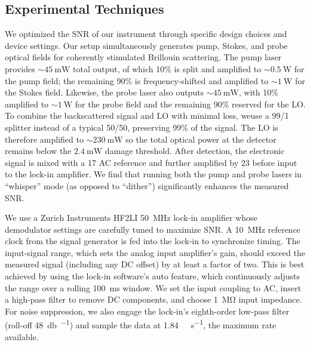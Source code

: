 \subsection{Experimental Techniques}
\label{Methods:Experimental Techniques}
We optimized the \ac{SNR} of our instrument through specific design choices and device settings. Our setup simultaneously generates pump, Stokes, and probe optical fields for coherently stimulated Brillouin scattering. The pump laser provides \(\sim\!\SI{45}{\milli\watt}\) total output, of which 10\% is split and amplified to \(\sim\!\SI{0.5}{\watt}\) for the pump field; the remaining 90\% is frequency-shifted and amplified to \(\sim\!\SI{1}{\watt}\) for the Stokes field. Likewise, the probe laser also outputs \(\sim\!\SI{45}{\milli\watt}\), with 10\% amplified to \(\sim\!\SI{1}{\watt}\) for the probe field and the remaining 90\% reserved for the \ac{LO}. To combine the backscattered signal and \ac{LO} with minimal loss, weuse a 99/1 splitter instead of a typical 50/50, preserving 99\% of the signal. The \ac{LO} is therefore amplified to \(\sim\!\SI{230}{\milli\watt}\) so the total optical power at the detector remains below the \(\SI{2.4}{\milli\watt}\) damage threshold. After detection, the electronic signal is mixed with a \SI{17}{\dBm} \ac{AC} reference and further amplified by \SI{23}{\dBm} before input to the lock-in amplifier. We find that running both the pump and probe lasers in “whisper” mode (as opposed to “dither”) significantly enhances the measured SNR.

We use a Zurich Instruments HF2LI \SI{50}{\mega\hertz} lock-in amplifier whose demodulator settings are carefully tuned to maximize \ac{SNR}. A \SI{10}{\mega\hertz} reference clock from the signal generator is fed into the lock-in to synchronize timing. The input-signal range, which sets the analog input amplifier’s gain, should exceed the measured signal (including any \ac{DC} offset) by at least a factor of two. This is best achieved by using the lock-in software’s auto feature, which continuously adjusts the range over a rolling \SI{100}{\milli\second} window. We set the input coupling to \ac{AC}, insert a high-pass filter to remove \ac{DC} components, and choose \SI{1}{\mega\ohm} input impedance. For noise suppression, we also engage the lock-in’s eighth-order low-pass filter (roll-off \SI{48}{\decibel\per\octave}) and sample the data at \SI{1.84}{\mega\sample\per\second}, the maximum rate available.

